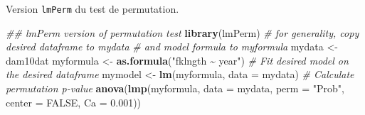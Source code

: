 \documentclass[
  12pt,
]{book}
\newenvironment{Shaded}{\begin{snugshade}}{\end{snugshade}}
\newcommand{\CharTok}[1]{\textcolor[rgb]{0.31,0.60,0.02}{#1}}
\newcommand{\CommentTok}[1]{\textcolor[rgb]{0.56,0.35,0.01}{\textit{#1}}}
\newcommand{\ControlFlowTok}[1]{\textcolor[rgb]{0.13,0.29,0.53}{\textbf{#1}}}
\newcommand{\DataTypeTok}[1]{\textcolor[rgb]{0.13,0.29,0.53}{#1}}
\newcommand{\DecValTok}[1]{\textcolor[rgb]{0.00,0.00,0.81}{#1}}
\newcommand{\FloatTok}[1]{\textcolor[rgb]{0.00,0.00,0.81}{#1}}
\newcommand{\KeywordTok}[1]{\textcolor[rgb]{0.13,0.29,0.53}{\textbf{#1}}}
\newcommand{\NormalTok}[1]{#1}
\newcommand{\OperatorTok}[1]{\textcolor[rgb]{0.81,0.36,0.00}{\textbf{#1}}}
\newcommand{\OtherTok}[1]{\textcolor[rgb]{0.56,0.35,0.01}{#1}}
\newcommand{\StringTok}[1]{\textcolor[rgb]{0.31,0.60,0.02}{#1}}
\begin{document}
\begin{Shaded}
\end{Shaded}

Version \texttt{lmPerm} du test de permutation.

\begin{Shaded}
\begin{Highlighting}[]
\CommentTok{\#\# lmPerm version of permutation test}
\KeywordTok{library}\NormalTok{(lmPerm)}
\CommentTok{\# for generality, copy desired dataframe to mydata}
\CommentTok{\# and model formula to myformula}
\NormalTok{mydata \textless{}{-}}\StringTok{ }\NormalTok{dam10dat}
\NormalTok{myformula \textless{}{-}}\StringTok{ }\KeywordTok{as.formula}\NormalTok{(}\StringTok{"fklngth \textasciitilde{} year"}\NormalTok{)}
\CommentTok{\# Fit desired model on the desired dataframe}
\NormalTok{mymodel \textless{}{-}}\StringTok{ }\KeywordTok{lm}\NormalTok{(myformula, }\DataTypeTok{data =}\NormalTok{ mydata)}
\CommentTok{\# Calculate permutation p{-}value}
\KeywordTok{anova}\NormalTok{(}\KeywordTok{lmp}\NormalTok{(myformula, }\DataTypeTok{data =}\NormalTok{ mydata, }\DataTypeTok{perm =} \StringTok{"Prob"}\NormalTok{, }\DataTypeTok{center =} \OtherTok{FALSE}\NormalTok{, }\DataTypeTok{Ca =} \FloatTok{0.001}\NormalTok{))}
\end{Highlighting}
\end{Shaded}
\end{document}
